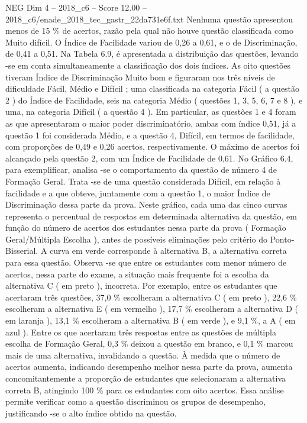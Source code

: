 \begin{textsample}{NEG Dim 4 – 2018\_c6 – Score 12.00 – 2018\_c6/enade\_2018\_tec\_gastr\_22da731e6f.txt}
Nenhuma questão apresentou menos de 15 \% de acertos, razão pela qual não houve questão classificada como Muito difícil.
O Índice de Facilidade variou de 0,26 a 0,61, e o de Discriminação, de 0,41 a 0,51.
Na Tabela 6.9, é apresentada a distribuição das questões, levando -se em conta simultaneamente a classificação dos dois índices.
As oito questões tiveram Índice de Discriminação Muito bom e figuraram nos três níveis de dificuldade Fácil, Médio e Difícil ; uma classificada na categoria Fácil ( a questão 2 ) do Índice de Facilidade, seis na categoria Médio ( questões 1, 3, 5, 6, 7 e 8 ), e uma, na categoria Difícil ( a questão 4 ).
Em particular, as questões 1 e 4 foram as que apresentaram o maior poder discriminatório, ambas com índice 0,51, já a questão 1 foi considerada Médio, e a questão 4, Difícil, em termos de facilidade, com proporções de 0,49 e 0,26 acertos, respectivamente.
O máximo de acertos foi alcançado pela questão 2, com um Índice de Facilidade de 0,61.
No Gráfico 6.4, para exemplificar, analisa -se o comportamento da questão de número 4 de Formação Geral.
Trata -se de uma questão considerada Difícil, em relação à facilidade e a que obteve, juntamente com a questão 1, o maior Índice de Discriminação dessa parte da prova.
Neste gráfico, cada uma das cinco curvas representa o percentual de respostas em determinada alternativa da questão, em função do número de acertos dos estudantes nessa parte da prova ( Formação Geral/Múltipla Escolha ), antes de possíveis eliminações pelo critério do Ponto-Bisserial.
A curva em verde corresponde à alternativa B, a alternativa correta para essa questão.
Observa -se que entre os estudantes com menor número de acertos, nessa parte do exame, a situação mais frequente foi a escolha da alternativa C ( em preto ), incorreta.
Por exemplo, entre os estudantes que acertaram três questões, 37,0 \% escolheram a alternativa C ( em preto ), 22,6 \% escolheram a alternativa E ( em vermelho ), 17,7 \% escolheram a alternativa D ( em laranja ), 13,1 \% escolheram a alternativa B ( em verde ), e 9,1 \%, a A ( em azul ).
Entre os que acertaram três respostas entre as questões de múltipla escolha de Formação Geral, 0,3 \% deixou a questão em branco, e 0,1 \% marcou mais de uma alternativa, invalidando a questão.
À medida que o número de acertos aumenta, indicando desempenho melhor nessa parte da prova, aumenta concomitantemente a proporção de estudantes que selecionaram a alternativa correta B, atingindo 100 \% para os estudantes com oito acertos.
Essa análise permite verificar como a questão discriminou os grupos de desempenho, justificando -se o alto índice obtido na questão.

\end{textsample}
